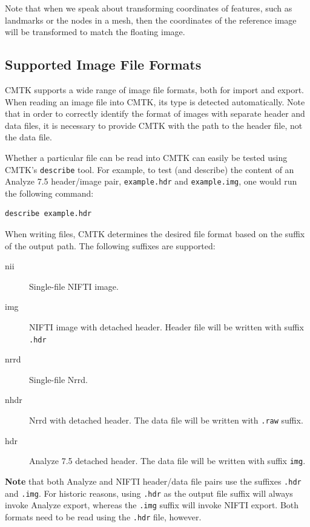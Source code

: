 \documentclass{InsightArticle}
\begin{document}
Note that when we speak about transforming coordinates of features, such as
landmarks or the nodes in a mesh, then the coordinates of the reference image
will be transformed to match the floating image.

\subsection{Supported Image File Formats}

CMTK supports a wide range of image file formats, both for import and
export. When reading an image file into CMTK, its type is detected
automatically. Note that in order to correctly identify the format of images
with separate header and data files, it is necessary to provide CMTK with the
path to the header file, not the data file.

Whether a particular file can be read into CMTK can easily be tested using
CMTK's \verb|describe| tool. For example, to test (and describe) the content
of an Analyze 7.5 header/image pair, \verb|example.hdr| and
\verb|example.img|, one would run the following command:
\begin{verbatim}
describe example.hdr
\end{verbatim}

When writing files, CMTK determines the desired file format based on the
suffix of the output path. The following suffixes are supported:
\begin{description}
\item [nii] Single-file NIFTI image.
\item [img] NIFTI image with detached header. Header file will be written with
  suffix \verb|.hdr|
\item [nrrd] Single-file Nrrd.
\item [nhdr] Nrrd with detached header. The data file will be written with
  \verb|.raw| suffix.
\item [hdr] Analyze 7.5 detached header. The data file will be written with
  suffix \verb|img|.
\end{description}

{\bf Note} that both Analyze and NIFTI header/data file pairs use the suffixes
\verb|.hdr| and \verb|.img|. For historic reasons, using \verb|.hdr| as the
output file suffix will always invoke Analyze export, whereas the \verb|.img|
suffix will invoke NIFTI export. Both formats need to be read using the
\verb|.hdr| file, however.
\end{document}
